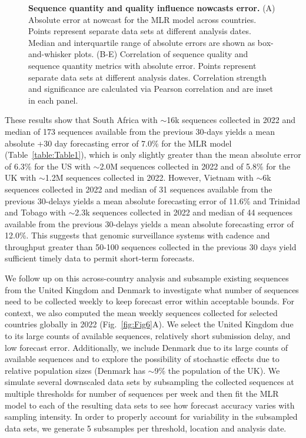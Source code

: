 \documentclass[10pt,letterpaper]{article}
\begin{document}
\begin{figure}[tb!]
	\centering
	\caption{
		\textbf{Sequence quantity and quality influence nowcasts error.}
    (A) Absolute error at nowcast for the MLR model across countries.
		Points represent separate data sets at different analysis dates.
		Median and interquartile range of absolute errors are shown as box-and-whisker plots.
		(B-E) Correlation of sequence quality and sequence quantity metrics with absolute error.
		Points represent separate data sets at different analysis dates.
    Correlation strength and significance are calculated via Pearson correlation and are inset in each panel.
	}
	\label{fig:Fig5}
\end{figure}

These results show that South Africa with $\sim$16k sequences collected in 2022 and median of 173 sequences available from the previous 30-days yields a mean absolute +30 day forecasting error of 7.0\% for the MLR model (Table~\ref{table:Table1}), which is only slightly greater than the mean absolute error of 6.3\% for the US with $\sim$2.0M sequences collected in 2022 and of 5.8\% for the UK with $\sim$1.2M sequences collected in 2022.
However, Vietnam with $\sim$6k sequences collected in 2022 and median of 31 sequences available from the previous 30-delays yields a mean absolute forecasting error of 11.6\% and Trinidad and Tobago with $\sim$2.3k sequences collected in 2022 and median of 44 sequences available from the previous 30-delays yields a mean absolute forecasting error of 12.0\%.
This suggests that genomic surveillance systems with cadence and throughput greater than 50-100 sequences collected in the previous 30 days yield sufficient timely data to permit short-term forecasts.


We follow up on this across-country analysis and subsample existing sequences from the United Kingdom and Denmark to investigate what number of sequences need to be collected weekly to keep forecast error within acceptable bounds.
For context, we also computed the mean weekly sequences collected for selected countries globally in 2022 (Fig.~\ref{fig:Fig6}A).
We select the United Kingdom due to its large counts of available sequences, relatively short submission delay, and low forecast error.
Additionally, we include Denmark due to its large counts of available sequences and to explore the possibility of stochastic effects due to relative population sizes (Denmark has $\sim$9\% the population of the UK).
We simulate several downscaled data sets by subsampling the collected sequences at multiple thresholds for number of sequences per week and then fit the MLR model to each of the resulting data sets to see how forecast accuracy varies with sampling intensity.
In order to properly account for variability in the subsampled data sets, we generate 5 subsamples per threshold, location and analysis date.
\end{document}
